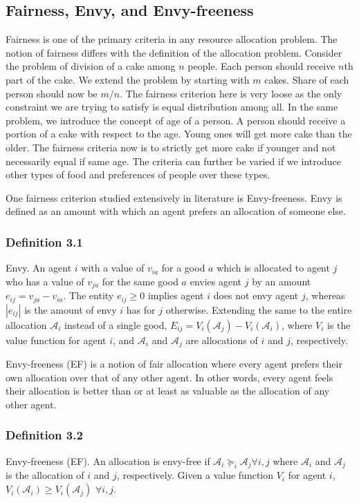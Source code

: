 \subsection{Fairness, Envy, and Envy-freeness}
Fairness is one of the primary criteria in any resource allocation problem. The notion of fairness differs with the definition of the allocation problem. Consider the problem of division of a cake among $n$ people. Each person should receive $n$th part of the cake. We extend the problem by starting with $m$ cakes. Share of each person should now be $m/n$. The fairness criterion here is very loose as the only constraint we are trying to satisfy is equal distribution among all. In the same problem, we introduce the concept of age of a person. A person should receive a portion of a cake with respect to the age. Young ones will get more cake than the older. The fairness criteria now is to strictly get more cake if younger and not necessarily equal if same age. The criteria can further be varied if we introduce other types of food and preferences of people over these types.

One fairness criterion studied extensively in literature is Envy-freeness. Envy is defined as an amount with which an agent prefers an allocation of someone else. 

\subsubsection{Definition 3.1} Envy.
An agent $i$ with a value of $v_{ia}$ for a good $a$ which is allocated to agent $j$ who has a value of $v_{ja}$ for the same good $a$ envies agent $j$ by an
amount $e_{ij} = v_{ja} - v_{ia}$. The entity $e_{ij} \geq 0$ implies agent $i$ does not envy agent $j$, whereas $|e_{ij}|$ is the amount of envy $i$ has for $j$ otherwise. Extending the same to the entire allocation $\mathcal{A}_i$ instead of a single good, $E_{ij} = V_i(\mathcal{A}_j) - V_i(\mathcal{A}_i)$, where $V_i$ is the value function for agent $i$, and $\mathcal{A}_i$ and $\mathcal{A}_j$ are allocations of $i$ and $j$, respectively.

Envy-freeness (EF) is a notion of fair allocation where every agent prefers their own allocation over that of any other agent. In other words, every agent feels their allocation is better than or at least as valuable as the allocation of any other agent.

\subsubsection{Definition 3.2} Envy-freeness (EF).
An allocation is envy-free if $\mathcal{A}_i \succeq_i \mathcal{A}_j \forall i,j$ where $\mathcal{A}_i$ and $\mathcal{A}_j$ is the allocation of $i$ and $j$, respectively. Given a value function $V_i$ for agent $i$, $V_i(\mathcal{A}_i) \geq V_i(\mathcal{A}_j)$ $\forall i,j$. 

